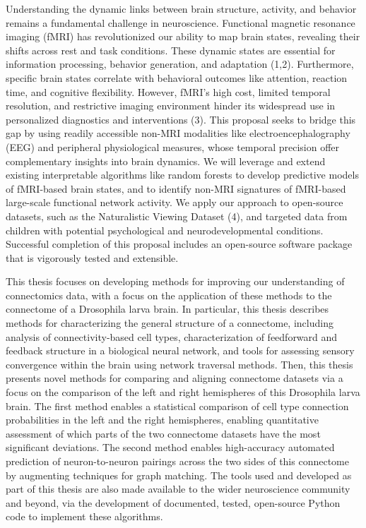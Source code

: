 Understanding the dynamic links between brain structure, activity, and behavior remains a fundamental challenge in neuroscience. Functional magnetic resonance imaging (fMRI) has revolutionized our ability to map brain states, revealing their shifts across rest and task conditions. These dynamic states are essential for information processing, behavior generation, and adaptation (1,2). Furthermore, specific brain states correlate with behavioral outcomes like attention, reaction time, and cognitive flexibility. However, fMRI's high cost, limited temporal resolution, and restrictive imaging environment hinder its widespread use in personalized diagnostics and interventions (3). This proposal seeks to bridge this gap by using readily accessible non-MRI modalities like electroencephalography (EEG) and peripheral physiological measures, whose temporal precision offer complementary insights into brain dynamics. We will leverage and extend existing interpretable algorithms like random forests to develop predictive models of fMRI-based brain states, and to identify non-MRI signatures of fMRI-based large-scale functional network activity. We apply our approach to open-source datasets, such as the Naturalistic Viewing Dataset (4), and targeted data from children with potential psychological and neurodevelopmental conditions. Successful completion of this proposal includes an open-source software package that is vigorously tested and extensible.

This thesis focuses on developing methods for improving our understanding of
connectomics data, with a focus on the application of these methods to the connectome
of a Drosophila larva brain. In particular, this thesis describes methods for characterizing the general structure of a connectome, including analysis of connectivity-based
cell types, characterization of feedforward and feedback structure in a biological
neural network, and tools for assessing sensory convergence within the brain using
network traversal methods. Then, this thesis presents novel methods for comparing
and aligning connectome datasets via a focus on the comparison of the left and right
hemispheres of this Drosophila larva brain. The first method enables a statistical
comparison of cell type connection probabilities in the left and the right hemispheres,
enabling quantitative assessment of which parts of the two connectome datasets have
the most significant deviations. The second method enables high-accuracy automated
prediction of neuron-to-neuron pairings across the two sides of this connectome by
augmenting techniques for graph matching. The tools used and developed as part of
this thesis are also made available to the wider neuroscience community and beyond,
via the development of documented, tested, open-source Python code to implement
these algorithms.

